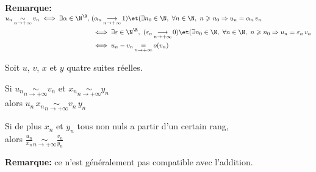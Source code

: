 \documentclass[12pt,twoside,a4paper]{article}
\begin{document}
		\begin{flushleft}
			\textbf{Remarque:}\\
			$\begin{aligned}
				u_n\mathop{\sim}\limits_{n\rightarrow+\infty}v_n \iff\exists\alpha\in\N^\R,\ &(\alpha_n\mathop{\longrightarrow}\limits_{n\rightarrow+\infty}1)\et(\exists n_0\in\N,\ \forall n\in\N,\ n\geqslant n_0\Rightarrow u_n=\alpha_n\,v_n\\
				&\iff\exists\varepsilon\in\N^\R,\ (\varepsilon_n\mathop{\longrightarrow}\limits_{n\rightarrow+\infty}0)\et(\exists n_0\in\N,\ \forall n\in\N,\ n\geqslant n_0\Rightarrow u_n=\varepsilon_n\,v_n\\
				&\iff u_n-v_n\mathop{=}\limits_{n\rightarrow+\infty}o(v_n)
			\end{aligned}$
		\end{flushleft}
		\newpage
		\begin{prop}
			Soit $u$, $v$, $x$ et $y$ quatre suites r\'eelles.
			\begin{liste}
				\item Si $u_n\mathop{\sim}\limits_{n\rightarrow+\infty}v_n$ et $x_n\mathop{\sim}\limits_{n\rightarrow+\infty}y_n$\\
					alors $u_n\,x_n\mathop{\sim}\limits_{n\rightarrow+\infty}v_n\,y_n$
				\item Si de plus $x_n$ et $y_n$ tous non nuls a partir d'un certain rang,\\
				alors $\frac{u_n}{x_n}\mathop{\sim}\limits_{n\rightarrow+\infty}\frac{v_n}{y_n}$
			\end{liste}
		\end{prop}
		\begin{flushleft}
			\textbf{Remarque:} ce n'est g\'en\'eralement pas compatible avec l'addition.
		\end{flushleft}
\end{document}
